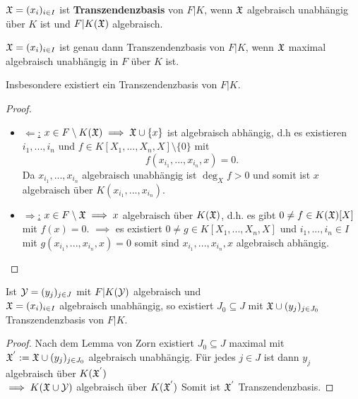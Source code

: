 \begin{definition}
    $\mathfrak{X} = (x_i)_{i \in I}$ ist \textbf{Transzendenzbasis} von $F|K$, 
    wenn $\mathfrak{X}$ algebraisch unabhängig über $K$ ist und $F|K(\mathfrak{X})$ algebraisch.
\end{definition}

\begin{satz}
    $\mathfrak{X} = (x_i)_{i \in I}$ ist genau dann Transzendenzbasis von $F|K$,
    wenn $\mathfrak{X}$ maximal algebraisch unabhängig in $F$ über $K$ ist.
    
    Insbesondere existiert ein Transzendenzbasis von $F|K$.
\end{satz}

\begin{proof}
    \begin{itemize}[label=]
        \item \underline{$\Leftarrow$:} $x \in F \setminus K(\mathfrak{X}) \implies \mathfrak{X} \cup \{x\}$ ist algebraisch abhängig, 
        d.h es existieren $i_1,...,i_n$ und $f \in K[X_1,...,X_n, X] \setminus \{0\}$ mit 
        $$ f(x_{i_1},...,x_{i_n},x) = 0. $$
        Da $x_{i_1},...,x_{i_n}$ algebraisch unabhängig ist $\deg_X f > 0$ 
        und somit ist $x$ algebraisch über $K(x_{i_1},...,x_{i_n})$.
        
        \item \underline{$\Rightarrow$:} $x \in F \setminus \mathfrak{X} \implies x$ algebraisch über $K(\mathfrak{X})$,
        d.h. es gibt $0 \neq f \in K(\mathfrak{X})[X]$ mit $f(x) = 0$. 
        $\implies$ es existiert $0\neq g \in K[X_1,...,X_n,X]$ und $i_1,...,i_n \in I$ mit
        $g(x_{i_1},...,x_{i_n},x) = 0$ somit sind $x_{i_1},...,x_{i_n},x$ algebraisch abhängig.
    \end{itemize}
\end{proof}

\begin{lemma}[Austauschlemma]\label{lemma:exchange}
    Ist $\mathcal{Y}=(y_j)_{j \in J}$ mit $F|K(\mathcal{Y})$ algebraisch und \\
    $\mathfrak{X} = (x_i)_{i \in I}$ algebraisch unabhängig,
    so existiert $J_0 \subseteq J$ mit $\mathfrak{X} \cup (y_j)_{j\in J_0}$ Transzendenzbasis von $F|K$.
\end{lemma}
\begin{proof}
    Nach dem Lemma von Zorn existiert $J_0 \subseteq J$ maximal mit 
    $\mathfrak{X}^{'} := \mathfrak{X} \cup (y_j)_{j \in J_0}$ algebraisch unabhängig.
    Für jedes $j \in J$ ist dann $y_j$ algebraisch über $K(\mathfrak{X}^{'})$\\
    $\implies K(\mathfrak{X}\cup \mathcal{Y})$ algebraisch über $K(\mathfrak{X}^{'})$
    Somit ist $\mathfrak{X}^{'}$ Transzendenzbasis.
\end{proof}

